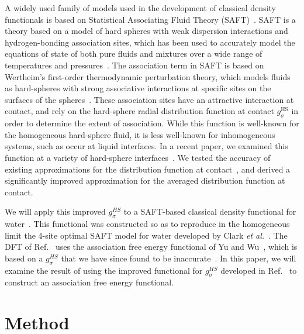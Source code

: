 \documentclass[twocolumn,amsmath,amssymb,prl]{revtex4-1}
\begin{document}
A widely used family of models used in the development of classical
density functionals is based on Statistical Associating Fluid Theory
(SAFT)~\cite{chapman1989saft}.  SAFT is a theory based on a model of
hard spheres with weak dispersion interactions and hydrogen-bonding
association sites, which has been used to accurately model the
equations of state of both pure fluids and mixtures over a wide range
of temperatures and pressures~\cite{muller2001molecular,
  tan2008recent}.  The association term in SAFT is based on Wertheim's
first-order thermodynamic perturbation theory, which models fluids as
hard-spheres with strong associative interactions at specific sites on
the surfaces of the spheres~\cite{wertheim1984fluidsI,
  wertheim1984fluidsII, wertheim1986fluidsIII, wertheim1986fluidsIV}.
These association sites have an attractive interaction at contact, and
rely on the hard-sphere radial distribution function at contact
$g_\sigma^\text{HS}$ in order to determine the extent of association.
While this function is well-known for the homogeneous hard-sphere
fluid, it is less well-known for inhomogeneous systems, such as occur
at liquid interfaces.  In a recent paper, we examined this function at
a variety of hard-sphere interfaces~\cite{schulte2012using}.  We
tested the accuracy of existing approximations for the distribution
function at contact~\cite{yu2002fmt-dft-inhomogeneous-associating,
  gross2009density}, and derived a significantly improved
approximation for the averaged distribution function at contact.

We will apply this improved $g_\sigma^{HS}$ to a SAFT-based
classical density functional for water~\cite{hughes2013classical}.
This functional was constructed so as to reproduce in the homogeneous
limit the 4-site optimal SAFT model for water developed by Clark
\emph{et al.}~\cite{clark2006developing}.  The DFT of
Ref.~ uses the association free energy
functional of Yu and
Wu~\cite{yu2002fmt-dft-inhomogeneous-associating}, which is based on a
$g_\sigma^{HS}$ that we have since found to be
inaccurate~\cite{schulte2012using}.  In this paper, we will examine
the result of using the improved functional for $g_\sigma^{HS}$
developed in Ref.~ to construct an
association free energy functional.

\section{Method}
\end{document}
